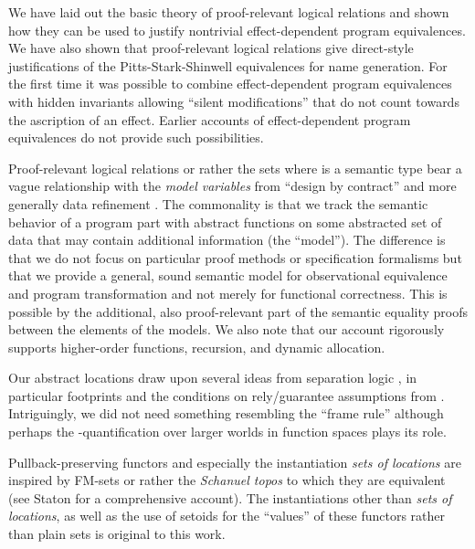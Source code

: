 \documentclass[orivec]{llncs}
\makeatletter
\renewcommand{\section}{\@startsection{section}{1}{\z@}{-10\p@ \@plus -4\p@ \@minus -4\p@}{5\p@ \@plus 4\p@ \@minus 4\p@}{\normalfont\bfseries\boldmath\rightskip=\z@ \@plus 8em\pretolerance=10000 }}
\makeatother
\begin{document}
\section{Conclusions}
\label{sec:conclusions}
We have laid out the basic theory of proof-relevant logical relations
and shown how they can be used to justify nontrivial effect-dependent
program equivalences. We have also shown that proof-relevant logical
relations give direct-style justifications of the Pitts-Stark-Shinwell
equivalences for name generation. For the first time it was possible
to combine effect-dependent program equivalences with hidden
invariants allowing ``silent modifications'' that do not count towards
the ascription of an effect.
Earlier accounts of effect-dependent program equivalences
\cite{DBLP:conf/popl/KammarP12,DBLP:conf/ppdp/BentonKBH09,DBLP:conf/ppdp/BentonKBH07,DBLP:conf/aplas/BentonKHB06,DBLP:conf/icfp/ThamsborgB11}
do not provide such possibilities.

Proof-relevant logical relations or rather the sets  where 
is a semantic type bear a vague relationship with the \emph{model
  variables} \cite{DBLP:journals/spe/CheonLSE05} from ``design by
contract'' \cite{DBLP:journals/computer/Meyer92} and more generally
data refinement \cite{DBLP:books/cu/RoeverE1998}. The commonality is
that we track the semantic behavior of a program part with abstract
functions on some abstracted set of data that may contain additional
information (the ``model''). The difference is that we do not focus on
particular proof methods or specification formalisms but that we
provide a general, sound semantic model for observational equivalence
and program transformation and not merely for functional
correctness. This is possible by the additional, also proof-relevant
part of the semantic equality proofs between the elements of the
models. We also note that our account rigorously supports higher-order
functions, recursion, and dynamic allocation. 



Our abstract locations draw upon several ideas from separation logic
\cite{DBLP:conf/lics/Reynolds02}, in particular footprints and the
conditions on rely/guarantee assumptions from
\cite{DBLP:conf/concur/VafeiadisP07}. Intriguingly, we did not need
something resembling the ``frame rule'' although perhaps the
-quantification over larger worlds in function spaces plays its
role.

Pullback-preserving functors and especially the instantiation
\emph{sets of locations} are inspired by FM-sets 
\cite{DBLP:journals/fac/GabbayP02} or rather the \emph{Schanuel topos}
to which they are equivalent (see Staton \cite{statonphd} for a
comprehensive account). The instantiations other than \emph{sets of
  locations}, as well as the use of setoids for the ``values'' of
these functors rather than plain sets is original to this work.
\end{document}
